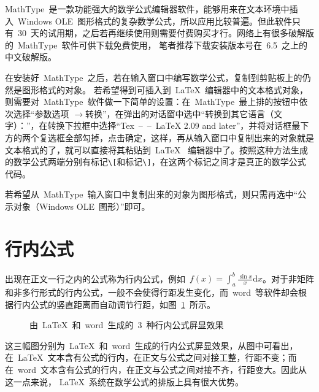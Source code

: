 MathType~是一款功能强大的数学公式编辑器软件，能够用来在文本环境中插入~Windows OLE~图形格式的复杂数学公式，所以应用比较普遍。但此软件只有~30~天的试用期，之后若再继续使用则需要付费购买才行。网络上有很多破解版的~MathType~软件可供下载免费使用，
笔者推荐下载安装版本号在~6.5~之上的中文破解版。

在安装好~MathType~之后，若在输入窗口中编写数学公式，复制到剪贴板上的仍然是图形格式的对象。
若希望得到可插入到~\LaTeX~编辑器中的文本格式对象，则需要对~MathType~软件做一下简单的设置：在~MathType~最上排的按钮中依次选择“参数选项
$\to$转换”，在弹出的对话窗中选中“转换到其它语言（文字）：”，在转换下拉框中选择“Tex~--~--~LaTeX 2.09 and later”，并将对话框最下方的两个复选框全部勾掉，点击确定，这样，再从输入窗口中复制出来的对象就是文本格式的了，就可以直接将其粘贴到~\LaTeX~
编辑器中了。按照这种方法生成的数学公式两端分别有标记\verb|\[|和标记\verb|\]|，在这两个标记之间才是真正的数学公式代码。

若希望从~MathType~输入窗口中复制出来的对象为图形格式，则只需再选中“公示对象（Windows OLE~图形）”即可。


\section{行内公式}

出现在正文一行之内的公式称为行内公式，例如~$f(x)=\int_{a}^{b}\frac{\sin{x}}{x}\mathrm{d}x$。对于非矩阵和非多行形式的行内公式，一般不会使得行距发生变化，而~word~等软件却会根据行内公式的竖直距离而自动调节行距，如图~\ref{hangju}~所示。
\begin{figure}[htbp]
  \centering
  \subfigure{\label{latex}}\addtocounter{subfigure}{-2}
  \subfigure{\label{word}}\addtocounter{subfigure}{-2}
  \subfigure{\label{pdf}}\addtocounter{subfigure}{-2}
  \caption{由~\LaTeX~和~word~生成的~3~种行内公式屏显效果}
  \label{hangju}
  \vspace{-1em}
\end{figure}
这三幅图分别为~\LaTeX~和~word~生成的行内公式屏显效果，从图中可看出，在~\LaTeX~文本含有公式的行内，在正文与公式之间对接工整，行距不变；而在~word~文本含有公式的行内，在正文与公式之间对接不齐，行距变大。因此从这一点来说，
\LaTeX~系统在数学公式的排版上具有很大优势。

